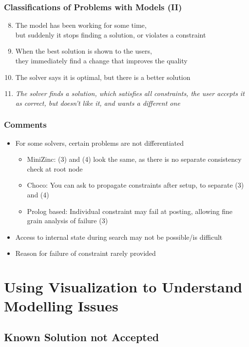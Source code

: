 \begin{frame}
\frametitle{Classifications of Problems with Models (II)}
\begin{enumerate}
\setcounter{enumi}{7}
\item \textcolor{black!50}{The model has been working for some time, \\but suddenly it stops finding a solution, or violates a constraint}
\item \textcolor{black!50}{When the best solution is shown to the users,\\ they immediately find a change that improves the quality}
\item The solver says it is optimal, but there is a better solution
\item \emph{The solver finds a solution, which satisfies all constraints, the user accepts it as correct, but doesn't like it, and wants a different one}
\end{enumerate}
\end{frame}

\begin{frame}
\frametitle{Comments}
\begin{itemize}
\item For some solvers, certain problems are not differentiated
\begin{itemize}
\item MiniZinc: (3) and (4) look the same, as there is no separate consistency check at root node
\item Choco: You can ask to propagate constraints after setup, to separate (3) and (4)
\item Prolog based: Individual constraint may fail at posting, allowing fine grain analysis of failure (3)
\end{itemize}
\item Access to internal state during search may not be possible/is difficult
\item Reason for failure of constraint rarely provided
\end{itemize}
\end{frame}

\section{Using Visualization to Understand Modelling Issues}

\subsection*{Known Solution not Accepted}

